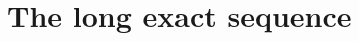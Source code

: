 \documentclass[11pt]{amsbook}
\newcommand{\longto}{\longrightarrow}
\theoremstyle{plain}
\newtheorem{proposition}[theorem]{Proposition}
\theoremstyle{definition}
\begin{document}
\section{The long exact sequence}

%
%
%
\end{document}
